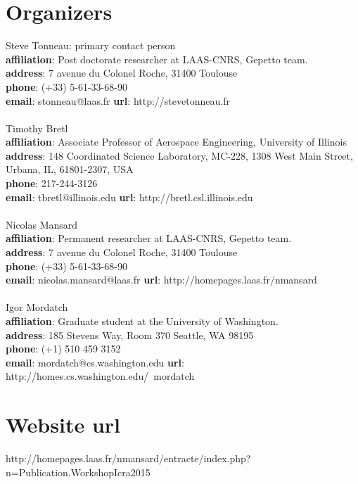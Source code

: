\documentclass[12pt]{article}
\begin{document}
\section{Organizers}
Steve Tonneau: primary contact person \\
\textbf{affiliation}: Post doctorate researcher at LAAS-CNRS, Gepetto team.\\
\textbf{address}: 7 avenue du Colonel Roche, 31400 Toulouse\\
\textbf{phone}: (+33) 5-61-33-68-90\\
\textbf{email}: stonneau@laas.fr
\textbf{url}: http://stevetonneau.fr\\ \\
Timothy Bretl \\
\textbf{affiliation}: Associate Professor of Aerospace Engineering, University of Illinois\\
\textbf{address}: 148 Coordinated Science Laboratory, MC-228, 1308 West Main Street, Urbana, IL, 61801-2307, USA \\
\textbf{phone}: 217-244-3126 \\
\textbf{email}: tbretl@illinois.edu 
\textbf{url}: http://bretl.csl.illinois.edu\\ \\
Nicolas Mansard \\
\textbf{affiliation}: Permanent researcher at LAAS-CNRS, Gepetto team.\\
\textbf{address}: 7 avenue du Colonel Roche, 31400 Toulouse\\
\textbf{phone}: (+33) 5-61-33-68-90\\
\textbf{email}: nicolas.mansard@laas.fr
\textbf{url}: http://homepages.laas.fr/nmansard\\ \\
Igor Mordatch\\
\textbf{affiliation}: Graduate student at the University of Washington.\\
\textbf{address}: 185 Stevens Way, Room 370 Seattle, WA 98195\\
\textbf{phone}: (+1) 510 459 3152\\
\textbf{email}: mordatch@cs.washington.edu
\textbf{url}: http://homes.cs.washington.edu/~mordatch\\


\section{Website url}
http://homepages.laas.fr/nmansard/entracte/index.php?n=Publication.WorkshopIcra2015
\end{document}
